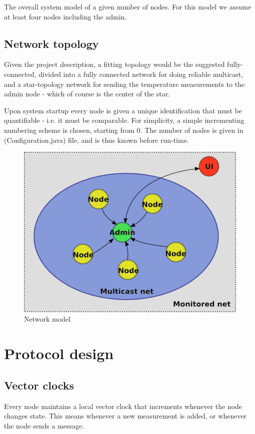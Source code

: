 \documentclass[10pt,a4paper]{article}
\begin{document}
The overall system model of a given number of nodes. For this model we assume at least four nodes including the admin.

\subsection{Network topology}
Given the project description, a fitting topology would be the suggested fully-connected, divided into a fully connected network for doing reliable multicast, and a star-topology network for sending the temperature measurements to the admin node - which of course is the center of the star.

Upon system startup every node is given a unique identification that must be quantifiable - i.e. it must be comparable. For simplicity, a simple incrementing numbering scheme is chosen, starting from 0. The number of nodes is given in \File(Configuration.java) file, and is thus known before run-time.

\begin{figure}[h]
\centering
\includegraphics[scale=0.65]{fig/Networkmodel.png}
 \caption{Network model}
 \label{fig:network_model}
\end{figure}


\section{Protocol design}
\subsection{Vector clocks}
Every node maintains a local vector clock that increments whenever the node changes state. This means whenever a new measurement is added, or whenever the node sends a message.
\end{document}
